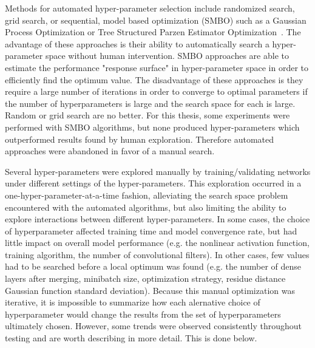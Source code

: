 Methods for automated hyper-parameter selection include randomized search, grid search, or  sequential, model based optimization (SMBO) such as a Gaussian Process Optimization or Tree Structured Parzen Estimator Optimization~\cite{bergstra2011}.
The advantage of these approaches is their ability to automatically search a hyper-parameter space without human intervention. 
SMBO approaches are able to estimate the performance "response surface" in hyper-parameter space in order to efficiently find the optimum value.
The disadvantage of these approaches is they require a large number of iterations in order to converge to optimal parameters if the number of hyperparameters is large and the search space for each is large. 
Random or grid search are no better.
For this thesis, some experiments were performed with SMBO algorithms, but none produced hyper-parameters which outperformed results found by human exploration.
Therefore automated approaches were abandoned in favor of a manual search.

Several hyper-parameters were explored manually by training/validating networks under different settings of the hyper-parameters.
This exploration occurred in a one-hyper-parameter-at-a-time fashion, alleviating the search space problem encountered with the automated algorithms, but also limiting the ability to explore interactions between different hyper-parameters.
In some cases, the choice of hyperparameter affected training time and model convergence rate, but had little impact on overall model performance (e.g. the nonlinear activation function, training algorithm, the number of convolutional filters).
In other cases, few values had to be searched before a local optimum was found (e.g. the number of dense layers after merging, minibatch size, optimization strategy, residue distance Gaussian function standard deviation).
Because this manual optimization was iterative, it is impossible to summarize how each alernative  choice of hyperparameter would change the results from the set of hyperparameters ultimately chosen.
However, some trends were observed consistently throughout testing and are worth describing in more detail.
This is done below.

